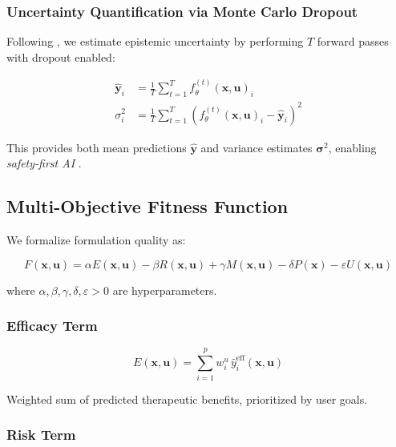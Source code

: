 \documentclass[12pt, a4paper]{article}
\begin{document}
\subsubsection{Uncertainty Quantification via Monte Carlo Dropout}

Following \citet{Gal2016}, we estimate epistemic uncertainty by performing $T$ forward passes with dropout enabled:

\begin{align}
    \hat{\mathbf{y}}_i &= \frac{1}{T} \sum_{t=1}^T f_\theta^{(t)}(\mathbf{x}, \mathbf{u})_i \\
    \sigma_i^2 &= \frac{1}{T} \sum_{t=1}^T \left(f_\theta^{(t)}(\mathbf{x}, \mathbf{u})_i - \hat{\mathbf{y}}_i\right)^2
\end{align}

This provides both mean predictions $\hat{\mathbf{y}}$ and variance estimates $\boldsymbol{\sigma}^2$, enabling \textit{safety-first AI} \citep{UQClinical2025}.

\subsection{Multi-Objective Fitness Function}

We formalize formulation quality as:

\begin{equation}
F(\mathbf{x}, \mathbf{u}) = \alpha E(\mathbf{x}, \mathbf{u}) - \beta R(\mathbf{x}, \mathbf{u}) + \gamma M(\mathbf{x}, \mathbf{u}) - \delta P(\mathbf{x}) - \varepsilon U(\mathbf{x}, \mathbf{u})
\end{equation}

where $\alpha, \beta, \gamma, \delta, \varepsilon > 0$ are hyperparameters.

\subsubsection{Efficacy Term}

\begin{equation}
E(\mathbf{x}, \mathbf{u}) = \sum_{i=1}^p w_i^u \, \hat{y}_i^{\text{eff}}(\mathbf{x}, \mathbf{u})
\end{equation}

Weighted sum of predicted therapeutic benefits, prioritized by user goals.

\subsubsection{Risk Term}
\end{document}
